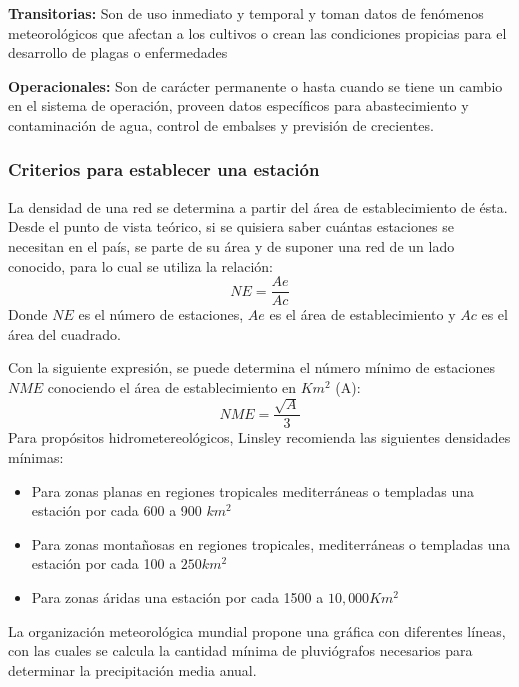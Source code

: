 \textbf{Transitorias:} Son de uso inmediato y temporal y toman datos de fenómenos meteorológicos que afectan a los cultivos o crean las condiciones propicias para el desarrollo de plagas o enfermedades

\textbf{Operacionales:} Son de carácter permanente o hasta cuando se tiene un cambio en el sistema de operación, proveen datos específicos para abastecimiento y contaminación de agua, control de embalses y previsión de crecientes.

\subsubsection{Criterios para establecer una estación}

La densidad de una red se determina a partir del área de establecimiento de ésta. Desde el punto de vista teórico, si se quisiera saber cuántas estaciones se necesitan en el país, se parte de su área y de suponer una red de un lado conocido, para lo cual se utiliza la relación:
\begin{equation}
    NE= \frac{Ae}{Ac}
\end{equation}
Donde $NE$ es el número de estaciones, $Ae$ es el área de establecimiento y $Ac$ es el área del cuadrado.

Con la siguiente expresión, se puede determina el número mínimo de estaciones $NME$ conociendo el área de establecimiento en $Km^2$ (A):
\begin{equation}
    NME = \frac{\sqrt{A}}{3} 
\end{equation}
Para propósitos hidrometereológicos, Linsley recomienda las siguientes densidades mínimas: 
\begin{itemize}
    \item Para zonas planas en regiones tropicales mediterráneas o templadas una estación por cada 600 a 900 $km^2$
    \item Para zonas montañosas en regiones tropicales, mediterráneas o templadas una estación por cada 100 a $250km^2$
    \item Para zonas áridas una estación por cada 1500 a $10,000 Km^2$
\end{itemize}
La organización meteorológica mundial propone una gráfica con diferentes líneas, con las cuales se calcula la cantidad mínima de pluviógrafos necesarios para determinar la precipitación media anual.

